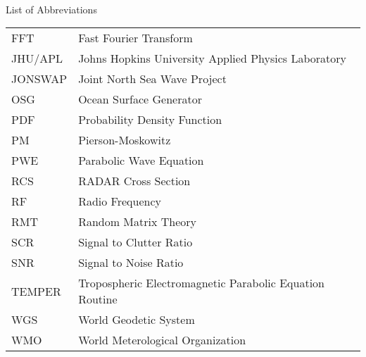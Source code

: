 

\renewcommand{\baselinestretch}{1}
\small\normalsize
\hbox{\ }

\vspace{-4em}

\begin{center}
\large{List of Abbreviations}
\end{center} 

\vspace{3pt}

\begin{supertabular}{ll}
FFT & Fast Fourier Transform \\
JHU/APL & Johns Hopkins University Applied Physics Laboratory \\
JONSWAP & Joint North Sea Wave Project\\
OSG & Ocean Surface Generator \\
PDF & Probability Density Function \\
PM & Pierson-Moskowitz \\
PWE & Parabolic Wave Equation \\
RCS & RADAR Cross Section \\
RF & Radio Frequency \\
RMT & Random Matrix Theory \\
SCR & Signal to Clutter Ratio \\
SNR & Signal to Noise Ratio\\
TEMPER & Tropospheric Electromagnetic Parabolic Equation Routine \\
WGS & World Geodetic System \\
WMO & World Meterological Organization \\
\end{supertabular}
